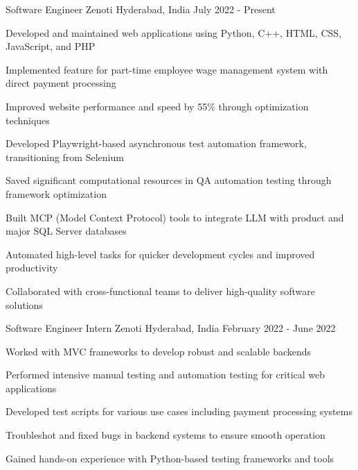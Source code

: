 \documentclass[11pt, a4paper]{awesome-cv} %
\begin{document}
\begin{cventries}
\cventry
    {Software Engineer} %
    {Zenoti} %
    {Hyderabad, India} %
    {July 2022 - Present} %
    {
      \begin{cvitems}
        \item {Developed and maintained web applications using Python, C++, HTML, CSS, JavaScript, and PHP}
        \item {Implemented feature for part-time employee wage management system with direct payment processing}
        \item {Improved website performance and speed by 55\% through optimization techniques}
        \item {Developed Playwright-based asynchronous test automation framework, transitioning from Selenium}
        \item {Saved significant computational resources in QA automation testing through framework optimization}
        \item {Built MCP (Model Context Protocol) tools to integrate LLM with product and major SQL Server databases}
        \item {Automated high-level tasks for quicker development cycles and improved productivity}
        \item {Collaborated with cross-functional teams to deliver high-quality software solutions}
      \end{cvitems}
    }

\cventry
    {Software Engineer Intern} %
    {Zenoti} %
    {Hyderabad, India} %
    {February 2022 - June 2022} %
    {
      \begin{cvitems}
        \item {Worked with MVC frameworks to develop robust and scalable backends}
        \item {Performed intensive manual testing and automation testing for critical web applications}
        \item {Developed test scripts for various use cases including payment processing systems}
        \item {Troubleshot and fixed bugs in backend systems to ensure smooth operation}
        \item {Gained hands-on experience with Python-based testing frameworks and tools}
      \end{cvitems}
    }
\end{cventries}
\end{document}
